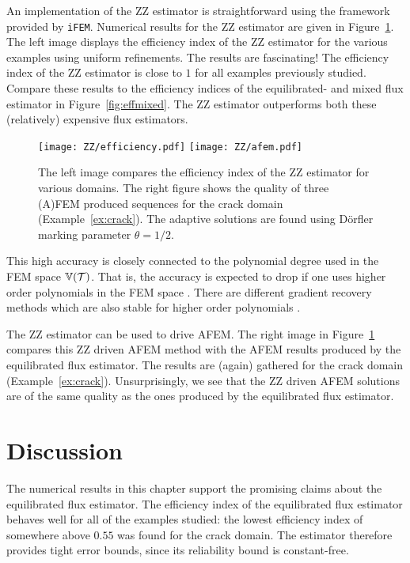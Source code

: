 \documentclass[thesis.tex]{subfiles}
\begin{document}
An implementation of the ZZ estimator is straightforward using the framework provided by \texttt{iFEM}. 
Numerical results for the ZZ estimator are given in Figure~\ref{fig:ZZ}.
The left image displays the efficiency index of the ZZ estimator for the various examples using uniform refinements.
The results are fascinating! The efficiency index of the ZZ estimator is close to $1$ for all examples previously
studied. Compare these results to the efficiency indices of the equilibrated- and mixed flux estimator in Figure~\ref{fig:effmixed}.
The ZZ estimator outperforms both these (relatively) expensive flux estimators. 
\begin{figure}
  \centering
  \texttt{[image: ZZ/efficiency.pdf]}
  \texttt{[image: ZZ/afem.pdf]}
  \caption{
    The left image compares the efficiency index of the ZZ estimator for various domains.
    The right figure shows the quality of three (A)FEM produced sequences for the crack domain (Example~\ref{ex:crack}). The adaptive solutions are found using D\"orfler marking parameter $\theta = 1/2$.
  }
  \label{fig:ZZ}
\end{figure}

This high accuracy is closely
connected to the polynomial degree used in the FEM space $\mathbb{V}(\mathcal{T})$. That is, the accuracy
is expected to drop if one uses higher order polynomials in the FEM space \cite{bartels2002each}.
There are different gradient recovery methods which are also stable for higher order polynomials \cite{zienkiewicz1992superconvergent}.

The ZZ estimator can be used to drive AFEM. The right image in Figure~\ref{fig:ZZ} compares this ZZ driven AFEM method
with the AFEM results produced by the equilibrated flux estimator. The results are (again) gathered for the crack domain 
(Example~\ref{ex:crack}). Unsurprisingly, we see that the ZZ driven AFEM solutions are of the same quality as the ones produced by the
equilibrated flux estimator. 


\section{Discussion}
The numerical results in this chapter support the promising claims about the equilibrated flux estimator.
The efficiency index of the equilibrated flux estimator behaves well for all of the examples studied:
the lowest efficiency index of somewhere above $0.55$ was found for the crack domain.
The estimator therefore provides tight error bounds, since its reliability bound is constant-free. 
\end{document}
